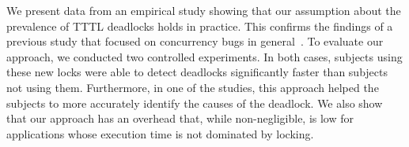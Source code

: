 We present data from an empirical study showing  that our assumption about the prevalence of TTTL deadlocks holds in practice. This confirms the findings of a previous study that focused on concurrency bugs in general~\cite{lu}. 
To evaluate our approach, we conducted two controlled experiments. In both cases, subjects using these new locks were able to detect deadlocks significantly faster than subjects not using them.  Furthermore, in one of the studies, this approach helped the subjects to more accurately identify the causes of the deadlock. We also show that our approach has an overhead that, while non-negligible, is low for applications whose execution time is not dominated by locking.

